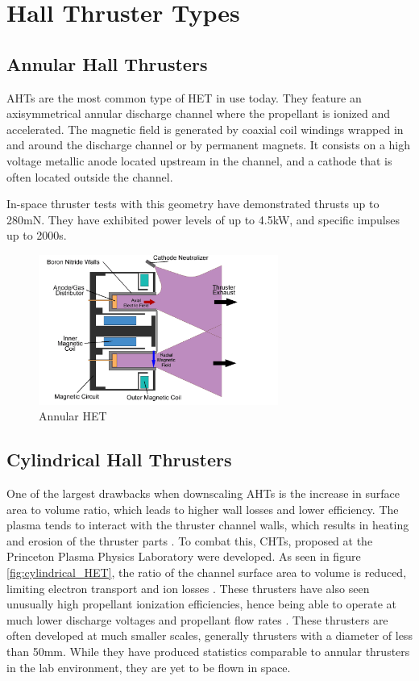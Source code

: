 \section{Hall Thruster Types}
\subsection{Annular Hall Thrusters}
\ac{AHT}s are the most common type of \ac{HET} in use today. They feature an axisymmetrical annular discharge channel where the propellant is ionized and accelerated. The magnetic field is generated by coaxial coil windings wrapped in and around the discharge channel or by permanent magnets. It consists on a high voltage metallic anode located upstream in the channel, and a cathode that is often located outside the channel.

In-space thruster tests with this geometry have demonstrated thrusts up to 280mN. They have exhibited power levels of up to 4.5kW, and specific impulses up to 2000s. \cite{bpt-4000} \cite{spt-140} \\

\begin{figure}[H]
    \centering
    \includegraphics[width=0.7\textwidth]{images/Concepts/Annular HET.png}
    \captionsetup{justification=centering}
    \caption{Annular \ac{HET}}
    \label{fig:annular_HET}
\end{figure}


\subsection{Cylindrical Hall Thrusters}

One of the largest drawbacks when downscaling \ac{AHT}s is the increase in surface area to volume ratio, which leads to higher wall losses and lower efficiency. The plasma tends to interact with the thruster channel walls, which results in heating and erosion of the thruster parts \cite{cht-plasma-wall-interactions}. To combat this, \ac{CHT}s, proposed at the Princeton Plasma Physics Laboratory were developed. As seen in figure \ref{fig:cylindrical_HET}, the ratio of the channel surface area to volume is reduced, limiting electron transport and ion losses \cite{pppl-cht}. These thrusters have also seen unusually high propellant ionization efficiencies, hence being able to operate at much lower discharge voltages and propellant flow rates \cite{cht-vs-aht}. These thrusters are often developed at much smaller scales, generally thrusters with a diameter of less than 50mm. While they have produced statistics comparable to annular thrusters in the lab environment, they are yet to be flown in space.

